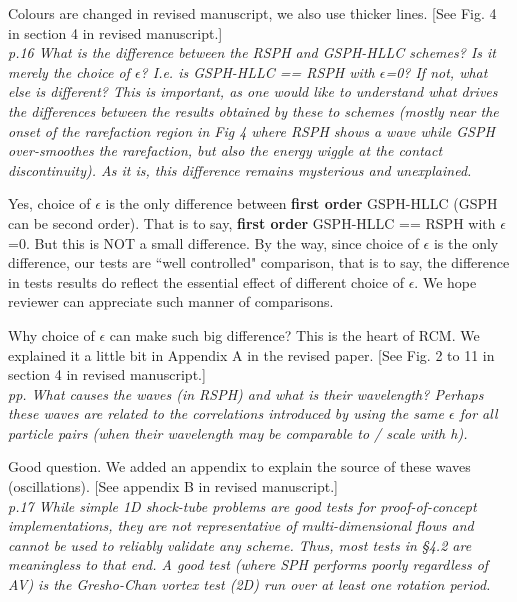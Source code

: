 \documentclass[10pt,a4paper]{article}
\begin{document}
Colours are changed in revised manuscript, we also use thicker lines. 
[See Fig. 4 in section 4 in revised manuscript.]
\\[3pt]

\textit{p.16 What is the difference between the RSPH and GSPH-HLLC schemes? Is it
merely the choice of $\epsilon$? I.e. is GSPH-HLLC == RSPH with $\epsilon$=0? If not, what else is different? This is important, as one would like to understand what drives the differences between the results obtained by these to schemes (mostly near
the onset of the rarefaction region in Fig 4 where RSPH shows a wave while GSPH over-smoothes the rarefaction, but also the energy wiggle at
the contact discontinuity). As it is, this difference remains mysterious and unexplained.}

Yes, choice of $\epsilon$ is the only difference between \textbf{first order} GSPH-HLLC (GSPH can be second order). That is to say, \textbf{first order} GSPH-HLLC == RSPH with $\epsilon$=0.
But this is NOT a small difference.
By the way, since choice of $\epsilon$ is the only difference, our tests are ``well controlled" comparison, that is to say, the difference in tests results do reflect the essential effect of different choice of $\epsilon$. We hope reviewer can appreciate such manner of comparisons.

Why choice of $\epsilon$ can make such big difference? This is the heart of RCM. We explained it a little bit in Appendix A in the revised paper.  [See Fig. 2 to 11 in section 4 in revised manuscript.]
\\[3pt]

\textit{pp. What causes the waves (in RSPH) and what is their wavelength? Perhaps
these waves are related to the correlations introduced by using the same
$\epsilon$ for all particle pairs (when their wavelength may be comparable
to / scale with h).}

Good question. We added an appendix to explain the source of these waves (oscillations).
[See appendix B in revised manuscript.]
\\[3pt]

\textit{p.17 While simple 1D shock-tube problems are good tests for proof-of-concept implementations, they are not representative of
multi-dimensional flows and cannot be used to reliably validate any scheme. Thus, most tests in §4.2 are meaningless to that end.
A good test (where SPH performs poorly regardless of AV) is the Gresho-Chan vortex test (2D) run over at least one rotation period.}
\end{document}
